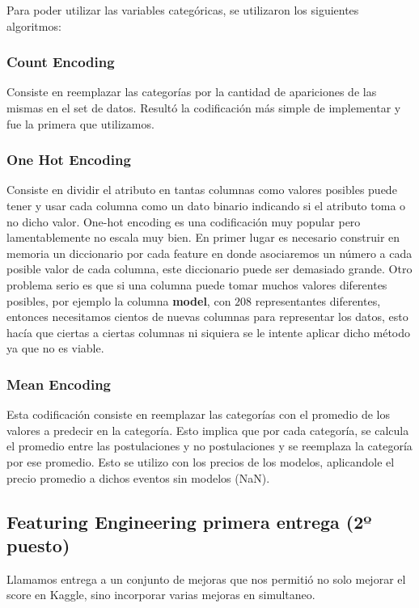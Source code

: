 \documentclass[a4paper ,12pt]{article}
\begin{document}
Para poder utilizar las variables categóricas, se utilizaron los siguientes algoritmos:

\subsubsection{Count Encoding}
Consiste en reemplazar las categorías por la cantidad de
apariciones de las mismas en el set de datos. Resultó la codificación más simple de
implementar y fue la primera que utilizamos.

\subsubsection{One Hot Encoding}

Consiste en dividir el atributo en tantas columnas como valores posibles puede tener y usar cada columna como un dato binario indicando si el atributo toma o no dicho
valor. One-hot encoding es una codificación muy popular pero lamentablemente
no escala muy bien. En primer lugar es necesario construir en memoria un
diccionario por cada feature en donde asociaremos un número a cada posible
valor de cada columna, este diccionario puede ser demasiado grande. Otro
problema serio es que si una columna puede tomar muchos valores diferentes
posibles, por ejemplo la columna \textbf{model}, con $208$ representantes diferentes, entonces necesitamos cientos de nuevas columnas para representar los datos, esto hacía que ciertas a ciertas columnas ni siquiera se le intente aplicar dicho método ya que no es viable.


\subsubsection{Mean Encoding}
Esta codificación consiste en reemplazar las categorías con el
promedio de los valores a predecir en la categoría. Esto implica que por cada categoría, se calcula el promedio entre las postulaciones y no postulaciones y se
reemplaza la categoría por ese promedio. Esto se utilizo con los precios de los modelos, aplicandole el precio promedio a dichos eventos sin modelos (NaN).

\subsection{Featuring Engineering primera entrega (2º puesto)}

Llamamos entrega a un conjunto de mejoras que nos permitió no solo mejorar el score en Kaggle, sino incorporar varias mejoras en simultaneo.
\end{document}

